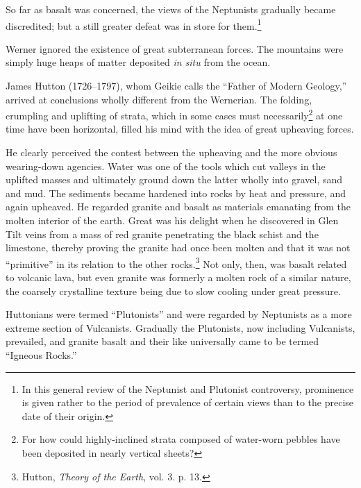 \documentclass[a4paper, 12pt, oneside]{article}
\begin{document}
So far as basalt was concerned, the views of the Neptunists gradually became discredited; but a still greater defeat was in store for them.\footnote{In this general review of the Neptunist and Plutonist controversy, prominence is given rather to the period of prevalence of certain views than to the precise date of their origin.}

Werner ignored the existence of great subterranean forces. The mountains were simply huge heaps of matter deposited \emph{in situ} from the ocean.

James Hutton (1726--1797), whom Geikie calls the ``Father of Modern Geology,'' arrived at conclusions wholly different from the Wernerian. The folding, crumpling and uplifting of strata, which in some cases must necessarily\footnote{For how could highly-inclined strata composed of water-worn pebbles have been deposited in nearly vertical sheets?} at one time have been horizontal, filled his mind with the idea of great upheaving forces.

He clearly perceived the contest between the upheaving and the more obvious wearing-down agencies. Water was one of the tools which cut valleys in the uplifted masses and ultimately ground down the latter wholly into gravel, sand and mud. The sediments became hardened into rocks by heat and pressure, and again upheaved. He regarded granite and basalt as materials emanating from the molten interior of the earth. Great was his delight when he discovered in Glen Tilt veins from a mass of red granite penetrating the black schist and the limestone, thereby proving the granite had once been molten and that it was not ``primitive'' in its relation to the other rocks.\footnote{Hutton, \emph{Theory of the Earth}, vol. 3. p. 13.} Not only, then, was basalt related to volcanic lava, but even granite was formerly a molten rock of a similar nature, the coarsely crystalline texture being due to slow cooling under great pressure.

Huttonians were termed ``Plutonists'' and were regarded by Neptunists as a more extreme section of Vulcanists. Gradually the Plutonists, now including Vulcanists, prevailed, and granite basalt and their like universally came to be termed ``Igneous Rocks.''
\end{document}
